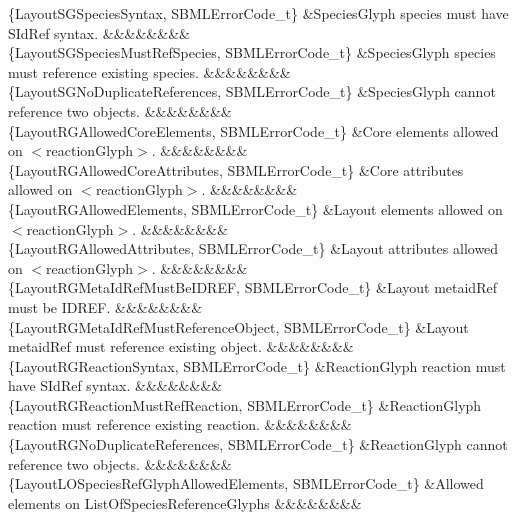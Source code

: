\begin{DoxyParagraph}{}
\begin{longtabu}
\{Layout\+S\+G\+Species\+Syntax, S\+B\+M\+L\+Error\+Code\+\_\+t\} &Species\+Glyph \textquotesingle{}species\textquotesingle{} must have S\+Id\+Ref syntax. &&&&&&&&\\
\{Layout\+S\+G\+Species\+Must\+Ref\+Species, S\+B\+M\+L\+Error\+Code\+\_\+t\} &Species\+Glyph species must reference existing species. &&&&&&&&\\
\{Layout\+S\+G\+No\+Duplicate\+References, S\+B\+M\+L\+Error\+Code\+\_\+t\} &Species\+Glyph cannot reference two objects. &&&&&&&&\\
\{Layout\+R\+G\+Allowed\+Core\+Elements, S\+B\+M\+L\+Error\+Code\+\_\+t\} &Core elements allowed on {\ttfamily $<$reaction\+Glyph$>$}. &&&&&&&&\\
\{Layout\+R\+G\+Allowed\+Core\+Attributes, S\+B\+M\+L\+Error\+Code\+\_\+t\} &Core attributes allowed on {\ttfamily $<$reaction\+Glyph$>$}. &&&&&&&&\\
\{Layout\+R\+G\+Allowed\+Elements, S\+B\+M\+L\+Error\+Code\+\_\+t\} &Layout elements allowed on {\ttfamily $<$reaction\+Glyph$>$}. &&&&&&&&\\
\{Layout\+R\+G\+Allowed\+Attributes, S\+B\+M\+L\+Error\+Code\+\_\+t\} &Layout attributes allowed on {\ttfamily $<$reaction\+Glyph$>$}. &&&&&&&&\\
\{Layout\+R\+G\+Meta\+Id\+Ref\+Must\+Be\+I\+D\+R\+EF, S\+B\+M\+L\+Error\+Code\+\_\+t\} &Layout \textquotesingle{}metaid\+Ref\textquotesingle{} must be I\+D\+R\+EF. &&&&&&&&\\
\{Layout\+R\+G\+Meta\+Id\+Ref\+Must\+Reference\+Object, S\+B\+M\+L\+Error\+Code\+\_\+t\} &Layout \textquotesingle{}metaid\+Ref\textquotesingle{} must reference existing object. &&&&&&&&\\
\{Layout\+R\+G\+Reaction\+Syntax, S\+B\+M\+L\+Error\+Code\+\_\+t\} &Reaction\+Glyph \textquotesingle{}reaction\textquotesingle{} must have S\+Id\+Ref syntax. &&&&&&&&\\
\{Layout\+R\+G\+Reaction\+Must\+Ref\+Reaction, S\+B\+M\+L\+Error\+Code\+\_\+t\} &Reaction\+Glyph reaction must reference existing reaction. &&&&&&&&\\
\{Layout\+R\+G\+No\+Duplicate\+References, S\+B\+M\+L\+Error\+Code\+\_\+t\} &Reaction\+Glyph cannot reference two objects. &&&&&&&&\\
\{Layout\+L\+O\+Species\+Ref\+Glyph\+Allowed\+Elements, S\+B\+M\+L\+Error\+Code\+\_\+t\} &Allowed elements on List\+Of\+Species\+Reference\+Glyphs &&&&&&&&\\

\end{longtabu}
\end{DoxyParagraph}
